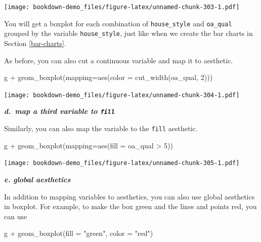 \documentclass[
]{book}
\newenvironment{Shaded}{\begin{snugshade}}{\end{snugshade}}
\newcommand{\AttributeTok}[1]{\textcolor[rgb]{0.77,0.63,0.00}{#1}}
\newcommand{\DecValTok}[1]{\textcolor[rgb]{0.00,0.00,0.81}{#1}}
\newcommand{\FunctionTok}[1]{\textcolor[rgb]{0.00,0.00,0.00}{#1}}
\newcommand{\NormalTok}[1]{#1}
\newcommand{\SpecialCharTok}[1]{\textcolor[rgb]{0.00,0.00,0.00}{#1}}
\newcommand{\StringTok}[1]{\textcolor[rgb]{0.31,0.60,0.02}{#1}}
\begin{document}
\texttt{[image: bookdown-demo\_files/figure-latex/unnamed-chunk-303-1.pdf]}

You will get a boxplot for each combination of \texttt{house\_style} and \texttt{oa\_qual} grouped by the variable \texttt{house\_style}, just like when we create the bar charts in Section \ref{bar-charts}.

As before, you can also cut a continuous variable and map it to aesthetic.

\begin{Shaded}
\begin{Highlighting}[]
\NormalTok{g }\SpecialCharTok{+} \FunctionTok{geom\_boxplot}\NormalTok{(}\AttributeTok{mapping=}\FunctionTok{aes}\NormalTok{(}\AttributeTok{color =} \FunctionTok{cut\_width}\NormalTok{(oa\_qual, }\DecValTok{2}\NormalTok{)))}
\end{Highlighting}
\end{Shaded}

\texttt{[image: bookdown-demo\_files/figure-latex/unnamed-chunk-304-1.pdf]}

\textbf{\emph{d.~map a third variable to \texttt{fill}}}

Similarly, you can also map the variable to the \texttt{fill} aesthetic.

\begin{Shaded}
\begin{Highlighting}[]
\NormalTok{g }\SpecialCharTok{+} \FunctionTok{geom\_boxplot}\NormalTok{(}\AttributeTok{mapping=}\FunctionTok{aes}\NormalTok{(}\AttributeTok{fill =}\NormalTok{ oa\_qual }\SpecialCharTok{\textgreater{}} \DecValTok{5}\NormalTok{))}
\end{Highlighting}
\end{Shaded}

\texttt{[image: bookdown-demo\_files/figure-latex/unnamed-chunk-305-1.pdf]}

\textbf{\emph{e. global aesthetics}}

In addition to mapping variables to aesthetics, you can also use global aesthetics in boxplot. For example, to make the box green and the lines and points red, you can use

\begin{Shaded}
\begin{Highlighting}[]
\NormalTok{g }\SpecialCharTok{+} \FunctionTok{geom\_boxplot}\NormalTok{(}\AttributeTok{fill =} \StringTok{"green"}\NormalTok{, }\AttributeTok{color =} \StringTok{"red"}\NormalTok{)}
\end{Highlighting}
\end{Shaded}
\end{document}
